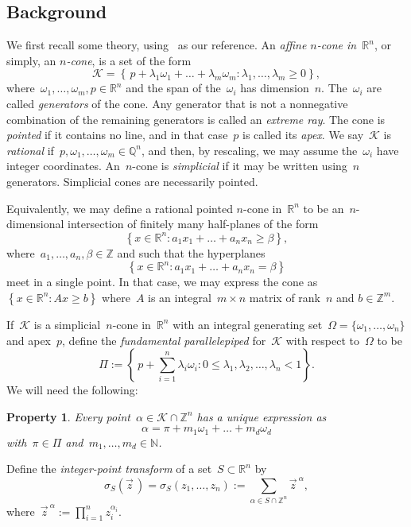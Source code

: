 \documentclass{amsart}
\newtheorem{property}[thm]{Property}
\newcommand{\Z}{\mathbb{Z}}
\newcommand{\Q}{\mathbb{Q}}
\newcommand{\R}{\mathbb{R}}
\newcommand{\N}{\mathbb{N}}
\newcommand{\K}{\mathcal{K}}
\begin{document}
\subsection{Background} We first recall some theory, using~\cite{Beck} as our
reference.  An {\em affine $n$-cone in~$\R^n$}, or simply, an {\em $n$-cone}, is
a set of the form
\[
  \K = \left\{\,
  p+\lambda_1\omega_1+\dots+\lambda_m\omega_m:\lambda_1,\dots,\lambda_m\geq0
\right\},
\]
where~$\omega_1,\dots,\omega_m,p\in\R^n$ and the span of the~$\omega_i$ has
dimension~$n$.  The~$\omega_i$ are called {\em generators} of the
cone.  Any generator that is not a nonnegative combination of the remaining
generators is called an {\em extreme ray}. The cone is {\em pointed} if it
contains no line, and in that case~$p$ is called its {\em apex}.  We say~$\K$ is
{\em rational} if~$p,\omega_1,\dots,\omega_m\in\Q^n$, and then, by rescaling, we
may assume the~$\omega_i$ have integer coordinates.  An~$n$-cone is {\em
simplicial} if it may be written using~$n$ generators.  Simplicial cones are
necessarily pointed.

Equivalently, we may define a rational pointed $n$-cone in~$\R^n$ to be
an~$n$-dimensional intersection of finitely many half-planes of the form
\[
  \left\{ x\in\R^n: a_1x_1+\dots+a_nx_n\geq \beta\right\},
\]
where~$a_1,\dots,a_n,\beta\in\Z$ and such that the hyperplanes 
\[
  \left\{ x\in\R^n: a_1x_1+\dots+a_nx_n= \beta\right\}
\]
meet in a single point. In that case, we may express the cone as $\left\{
x\in\R^n:Ax\geq b \right\}$ where~$A$ is an integral~$m\times n$ matrix of
rank~$n$ and $b\in\Z^m$.

If~$\K$ is a simplicial~$n$-cone in~$\R^n$ with an integral generating
set~$\Omega=\{\omega_1,\dots,\omega_n\}$ and apex~$p$, define the {\em
fundamental parallelepiped} for~$\K$ with respect to~$\Omega$ to be
\[
  \textstyle
  \Pi:=\left\{\,
  p+\sum_{i=1}^n\lambda_i\omega_i:0\leq\lambda_1,\lambda_2,\dots,\lambda_n<1
\right\}.
\]
We will need the following:
\begin{property}\label{property: characterization}  Every point~$\alpha\in\K\cap\Z^n$ has a unique
  expression as
\[
\alpha = \pi+m_1\omega_1+\dots+m_d\omega_d
\]
with~$\pi\in\Pi$ and~$m_1,\dots,m_d\in\N$.
\end{property}

Define the {\em integer-point transform} of a set~$S\subset\R^n$ by
\[
  \sigma_S(\vec{z}\,)=\sigma_S(z_1,\dots,z_n):=\sum_{\alpha\in
  S\cap\Z^n}\vec{z}^{\ \alpha},
\]
where~$\vec{z}^{\ \alpha}:=\prod_{i=1}^nz_i^{\alpha_i}$.
\end{document}
